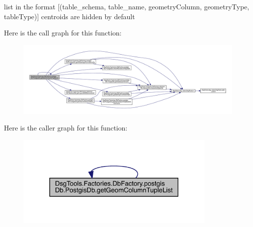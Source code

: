 \begin{DoxyVerb}list in the format [(table_schema, table_name, geometryColumn, geometryType, tableType)]
centroids are hidden by default
\end{DoxyVerb}
 Here is the call graph for this function\+:
\nopagebreak
\begin{figure}[H]
\begin{center}
\leavevmode
\includegraphics[width=350pt]{class_dsg_tools_1_1_factories_1_1_db_factory_1_1postgis_db_1_1_postgis_db_ac040dfd453d8439f6a23eac91d313afc_cgraph}
\end{center}
\end{figure}
Here is the caller graph for this function\+:
\nopagebreak
\begin{figure}[H]
\begin{center}
\leavevmode
\includegraphics[width=276pt]{class_dsg_tools_1_1_factories_1_1_db_factory_1_1postgis_db_1_1_postgis_db_ac040dfd453d8439f6a23eac91d313afc_icgraph}
\end{center}
\end{figure}
\mbox{\label{class_dsg_tools_1_1_factories_1_1_db_factory_1_1postgis_db_1_1_postgis_db_a9a3bd96db6a15182a4a52888b3384eac}} 
